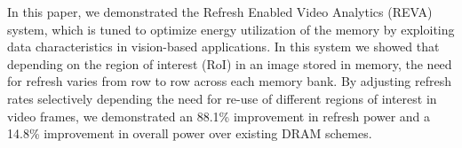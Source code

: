 In this paper, we demonstrated the Refresh Enabled Video Analytics (REVA) system, which is tuned to optimize energy utilization of the memory by exploiting data characteristics in vision-based applications. In this system we showed that depending on the region of interest (RoI) in an image stored in memory, the need for refresh varies from row to row across each memory bank. By adjusting refresh rates selectively depending the need for re-use of different regions of interest in video frames, we demonstrated an 88.1\% improvement in refresh power and a 14.8\% improvement in overall power over existing DRAM schemes.

